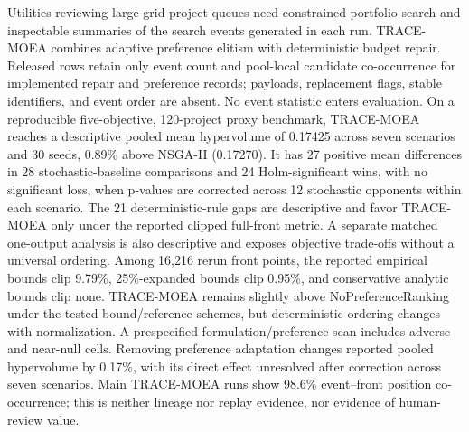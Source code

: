 Utilities reviewing large grid-project queues need constrained portfolio search and inspectable summaries of the search events generated in each run. TRACE-MOEA combines adaptive preference elitism with deterministic budget repair. Released rows retain only event count and pool-local candidate co-occurrence for implemented repair and preference records; payloads, replacement flags, stable identifiers, and event order are absent. No event statistic enters evaluation. On a reproducible five-objective, 120-project proxy benchmark, TRACE-MOEA reaches a descriptive pooled mean hypervolume of 0.17425 across seven scenarios and 30 seeds, 0.89\% above NSGA-II (0.17270). It has 27 positive mean differences in 28 stochastic-baseline comparisons and 24 Holm-significant wins, with no significant loss, when p-values are corrected across 12 stochastic opponents within each scenario. The 21 deterministic-rule gaps are descriptive and favor TRACE-MOEA only under the reported clipped full-front metric. A separate matched one-output analysis is also descriptive and exposes objective trade-offs without a universal ordering. Among 16,216 rerun front points, the reported empirical bounds clip 9.79\%, 25\%-expanded bounds clip 0.95\%, and conservative analytic bounds clip none. TRACE-MOEA remains slightly above NoPreferenceRanking under the tested bound/reference schemes, but deterministic ordering changes with normalization. A prespecified formulation/preference scan includes adverse and near-null cells. Removing preference adaptation changes reported pooled hypervolume by 0.17\%, with its direct effect unresolved after correction across seven scenarios. Main TRACE-MOEA runs show 98.6\% event--front position co-occurrence; this is neither lineage nor replay evidence, nor evidence of human-review value.

